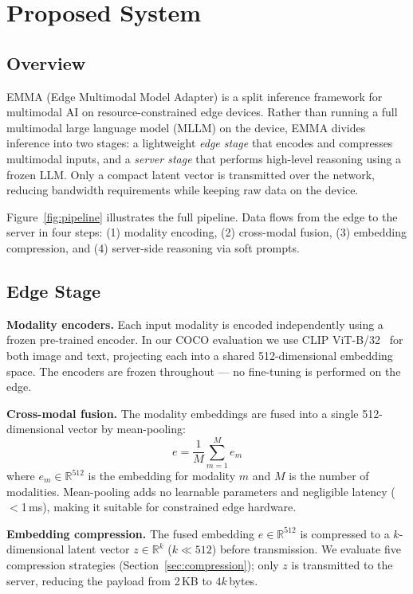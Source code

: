 \section{Proposed System}

\subsection{Overview}

EMMA (Edge Multimodal Model Adapter) is a split inference framework for multimodal AI on resource-constrained edge devices. Rather than running a full multimodal large language model (MLLM) on the device, EMMA divides inference into two stages: a lightweight \emph{edge stage} that encodes and compresses multimodal inputs, and a \emph{server stage} that performs high-level reasoning using a frozen LLM. Only a compact latent vector is transmitted over the network, reducing bandwidth requirements while keeping raw data on the device.

Figure~\ref{fig:pipeline} illustrates the full pipeline. Data flows from the edge to the server in four steps: (1) modality encoding, (2) cross-modal fusion, (3) embedding compression, and (4) server-side reasoning via soft prompts.

\subsection{Edge Stage}

\textbf{Modality encoders.} Each input modality is encoded independently using a frozen pre-trained encoder. In our COCO evaluation we use CLIP ViT-B/32~\cite{radford2021learning} for both image and text, projecting each into a shared 512-dimensional embedding space. The encoders are frozen throughout — no fine-tuning is performed on the edge.

\textbf{Cross-modal fusion.} The modality embeddings are fused into a single 512-dimensional vector by mean-pooling:
\begin{equation}
    e = \frac{1}{M} \sum_{m=1}^{M} e_m
\end{equation}
where $e_m \in \mathbb{R}^{512}$ is the embedding for modality $m$ and $M$ is the number of modalities. Mean-pooling adds no learnable parameters and negligible latency ($<$1\,ms), making it suitable for constrained edge hardware.

\textbf{Embedding compression.} The fused embedding $e \in \mathbb{R}^{512}$ is compressed to a $k$-dimensional latent vector $z \in \mathbb{R}^{k}$ ($k \ll 512$) before transmission. We evaluate five compression strategies (Section~\ref{sec:compression}); only $z$ is transmitted to the server, reducing the payload from 2\,KB to $4k$\,bytes.

